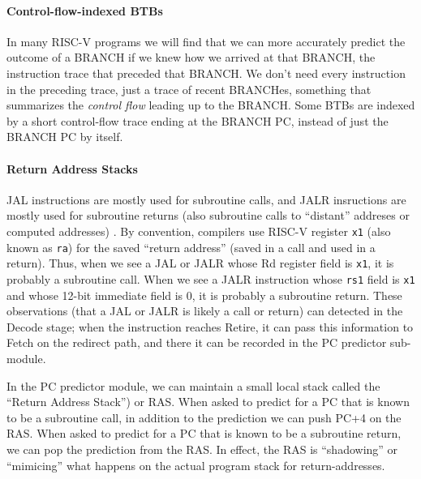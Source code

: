 
\paragraph{Control-flow-indexed BTBs}

\label{Sec_BTBs_w_cf_index}


In many RISC-V programs we will find that we can more accurately
predict the outcome of a BRANCH if we knew how we arrived at that
BRANCH, {\ie} the instruction trace that preceded that BRANCH.  We
don't need every instruction in the preceding trace, just a trace of
recent BRANCHes, {\ie} something that summarizes the \emph{control
flow} leading up to the BRANCH.  Some BTBs are indexed by a short
control-flow trace ending at the BRANCH PC, instead of just the BRANCH
PC by itself.


\paragraph{Return Address Stacks}

\label{Sec_RAS}


JAL instructions are mostly used for subroutine calls, and JALR
insructions are mostly used for subroutine returns (also subroutine
calls to ``distant'' addreses or computed addresses) .  By convention,
compilers use RISC-V register \verb|x1| (also known as \verb|ra|) for
the saved ``return address'' (saved in a call and used in a return).
Thus, when we see a JAL or JALR whose Rd register field is \verb|x1|,
it is probably a subroutine call.  When we see a JALR instruction
whose \verb|rs1| field is \verb|x1| and whose 12-bit immediate field
is 0, it is probably a subroutine return.  These observations (that a
JAL or JALR is likely a call or return) can detected in the Decode
stage; when the instruction reaches Retire, it can pass this
information to Fetch on the redirect path, and there it can be
recorded in the PC predictor sub-module.

In the PC predictor module, we can maintain a small local stack called
the ``Return Address Stack'') or RAS.  When asked to predict for a PC
that is known to be a subroutine call, in addition to the prediction
we can push PC+4 on the RAS.  When asked to predict for a PC that is
known to be a subroutine return, we can pop the prediction from the
RAS.  In effect, the RAS is ``shadowing'' or ``mimicing'' what happens
on the actual program stack for return-addresses.

